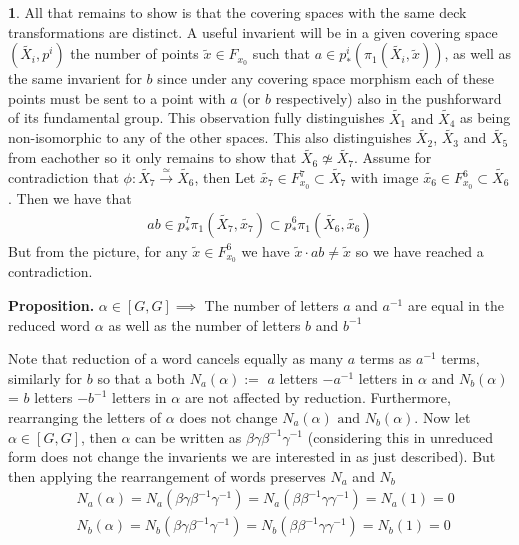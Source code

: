 \documentclass[10.5pt]{article}
\theoremstyle{definition}
\newtheorem{pb}{}
\newcommand{\tand}{\text{ and }}
\begin{document}
\begin{pb}
        All that remains to show is that the covering spaces with the same deck transformations are distinct. A useful invarient will be in a given covering space \((\tilde{X_i},p^i)\) the number of points \(\tilde{x} \in F_{x_0}\) such that \(a \in p^i_*(\pi_1(\tilde{X_i},\tilde{x}))\), as well as the same invarient for \(b\) since under any covering space morphism each of these points must be sent to a point with \(a\) (or \(b\) respectively) also in the pushforward of its fundamental group. This observation fully distinguishes \(\tilde{X_1} \tand \tilde{X_4}\) as being non-isomorphic to any of the other spaces. This also distinguishes \(\tilde{X_2}\), \(\tilde{X_3}\) and \(\tilde{X_5}\) from eachother so it only remains to show that \(\tilde{X_6} \not \simeq \tilde{X_7}\). Assume for contradiction that
        \(\phi: \tilde{X_7} \overset{\simeq}{\to} \tilde{X_6}\), then Let \(\tilde{x_7} \in F^7_{x_0} \subset \tilde{X_7}\) with image \(\tilde{x_6} \in F^6_{x_0} \subset \tilde{X_6}\).
        Then we have that
        \begin{align*}
            ab \in p^7_*\pi_1(\tilde{X_7},\tilde{x_7}) \subset p^6_*\pi_1(\tilde{X_6},\tilde{x_6})
        \end{align*}
        But from the picture, for any \(\tilde{x} \in F^6_{x_0}\) we have \(\tilde{x}\cdot ab \neq \tilde{x}\) so we have reached a contradiction.

        \textbf{Proposition.} \(\alpha \in [G,G] \implies\) The number of letters \(a\) and \(a^{-1}\) are equal in the reduced word \(\alpha\) as well as the number of letters \(b\) and \(b^{-1}\)

        Note that reduction of a word cancels equally as many \(a\) terms as \(a^{-1}\) terms, similarly for \(b\) so that a both \(N_a(\alpha) :=\) \(a\) letters \(- a^{-1}\) letters in \(\alpha\) and \(N_b(\alpha)\) = \(b\) letters \(- b^{-1}\) letters in \(\alpha\) are not affected by reduction. Furthermore, rearranging the letters of \(\alpha\) does not change \(N_a(\alpha) \tand N_b(\alpha)\). Now let \(\alpha \in [G,G]\), then \(\alpha\) can be written as \(\beta\gamma\beta^{-1}\gamma^{-1}\) (considering this in unreduced form does not change the invarients we are interested in as just described).
        But then applying the rearrangement of words preserves \(N_a\) and \(N_b\)
        \begin{align*}
            &N_a(\alpha) = N_a(\beta\gamma\beta^{-1}\gamma^{-1}) = N_a(\beta\beta^{-1}\gamma\gamma^{-1}) = N_a(1) = 0 \\
            &N_b(\alpha) = N_b(\beta\gamma\beta^{-1}\gamma^{-1}) = N_b(\beta\beta^{-1}\gamma\gamma^{-1}) = N_b(1) = 0 
        \end{align*}
    \end{pb}
\end{document}
